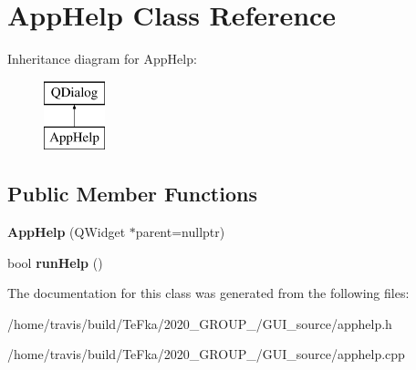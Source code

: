\hypertarget{class_app_help}{}\section{App\+Help Class Reference}
\label{class_app_help}
Inheritance diagram for App\+Help\+:\begin{figure}[H]
\begin{center}
\leavevmode
\includegraphics[height=2.000000cm]{class_app_help}
\end{center}
\end{figure}
\subsection*{Public Member Functions}
\begin{DoxyCompactItemize}
\item 
{\bfseries App\+Help} (Q\+Widget $\ast$parent=nullptr)\hypertarget{class_app_help_af11afe5130000748562f2a49a66d869b}{}\label{class_app_help_af11afe5130000748562f2a49a66d869b}

\item 
bool {\bfseries run\+Help} ()\hypertarget{class_app_help_af13259ffa31f8f85a1ea881e713bfc77}{}\label{class_app_help_af13259ffa31f8f85a1ea881e713bfc77}

\end{DoxyCompactItemize}


The documentation for this class was generated from the following files\+:\begin{DoxyCompactItemize}
\item 
/home/travis/build/\+Te\+Fka/2020\+\_\+\+G\+R\+O\+U\+P\+\_/\+G\+U\+I\+\_\+source/apphelp.\+h\item 
/home/travis/build/\+Te\+Fka/2020\+\_\+\+G\+R\+O\+U\+P\+\_/\+G\+U\+I\+\_\+source/apphelp.\+cpp\end{DoxyCompactItemize}
